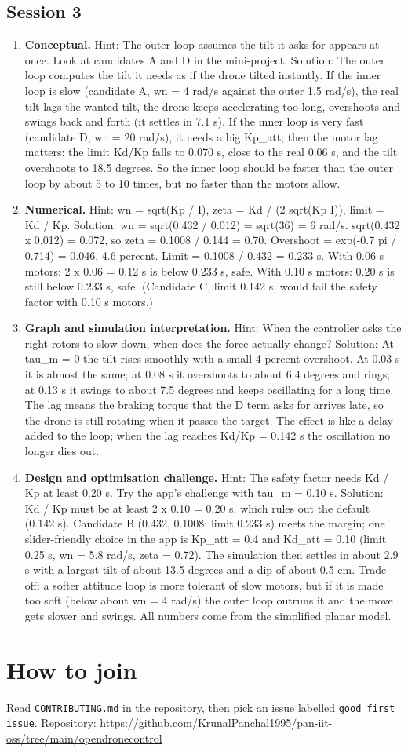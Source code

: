 \documentclass[11pt,a4paper]{article}
\begin{document}
\subsection*{Session 3}
\begin{enumerate}[nosep]
\item \textbf{Conceptual.} Hint: The outer loop assumes the tilt it asks for appears at once. Look at candidates A and D in the mini-project. Solution: The outer loop computes the tilt it needs as if the drone tilted instantly. If the inner loop is slow (candidate A, wn = 4 rad/s against the outer 1.5 rad/s), the real tilt lags the wanted tilt, the drone keeps accelerating too long, overshoots and swings back and forth (it settles in 7.1 s). If the inner loop is very fast (candidate D, wn = 20 rad/s), it needs a big Kp\_att; then the motor lag matters: the limit Kd/Kp falls to 0.070 s, close to the real 0.06 s, and the tilt overshoots to 18.5 degrees. So the inner loop should be faster than the outer loop by about 5 to 10 times, but no faster than the motors allow.
\item \textbf{Numerical.} Hint: wn = sqrt(Kp / I), zeta = Kd / (2 sqrt(Kp I)), limit = Kd / Kp. Solution: wn = sqrt(0.432 / 0.012) = sqrt(36) = 6 rad/s. sqrt(0.432 x 0.012) = 0.072, so zeta = 0.1008 / 0.144 = 0.70. Overshoot = exp(-0.7 pi / 0.714) = 0.046, 4.6 percent. Limit = 0.1008 / 0.432 = 0.233 s. With 0.06 s motors: 2 x 0.06 = 0.12 s is below 0.233 s, safe. With 0.10 s motors: 0.20 s is still below 0.233 s, safe. (Candidate C, limit 0.142 s, would fail the safety factor with 0.10 s motors.)
\item \textbf{Graph and simulation interpretation.} Hint: When the controller asks the right rotors to slow down, when does the force actually change? Solution: At tau\_m = 0 the tilt rises smoothly with a small 4 percent overshoot. At 0.03 s it is almost the same; at 0.08 s it overshoots to about 6.4 degrees and rings; at 0.13 s it swings to about 7.5 degrees and keeps oscillating for a long time. The lag means the braking torque that the D term asks for arrives late, so the drone is still rotating when it passes the target. The effect is like a delay added to the loop; when the lag reaches Kd/Kp = 0.142 s the oscillation no longer dies out.
\item \textbf{Design and optimisation challenge.} Hint: The safety factor needs Kd / Kp at least 0.20 s. Try the app's challenge with tau\_m = 0.10 s. Solution: Kd / Kp must be at least 2 x 0.10 = 0.20 s, which rules out the default (0.142 s). Candidate B (0.432, 0.1008; limit 0.233 s) meets the margin; one slider-friendly choice in the app is Kp\_att = 0.4 and Kd\_att = 0.10 (limit 0.25 s, wn = 5.8 rad/s, zeta = 0.72). The simulation then settles in about 2.9 s with a largest tilt of about 13.5 degrees and a dip of about 0.5 cm. Trade-off: a softer attitude loop is more tolerant of slow motors, but if it is made too soft (below about wn = 4 rad/s) the outer loop outruns it and the move gets slower and swings. All numbers come from the simplified planar model.
\end{enumerate}

\section{How to join}
Read \texttt{CONTRIBUTING.md} in the repository, then pick an issue labelled \texttt{good first issue}. Repository: \url{https://github.com/KrunalPanchal1995/pan-iit-oss/tree/main/opendronecontrol}
\end{document}
